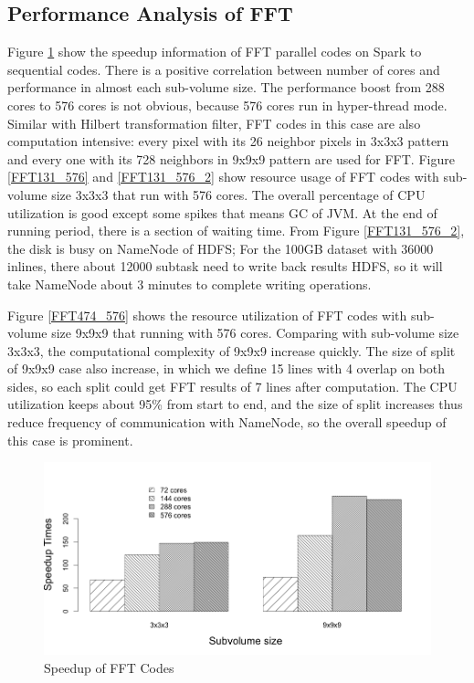 \subsection{Performance Analysis of FFT}
Figure \ref{FFTSpeedup} show the speedup information of FFT parallel codes on Spark to sequential codes. There is a positive correlation between number of cores and performance in almost each sub-volume size. The performance boost from 288 cores to 576 cores is not obvious, because 576 cores run in hyper-thread mode. Similar with Hilbert transformation filter, FFT codes in this case are also computation intensive: every pixel with its 26 neighbor pixels in 3x3x3 pattern and every one with its 728 neighbors in 9x9x9 pattern are used for FFT. Figure \ref{FFT131_576} and \ref{FFT131_576_2} show resource usage of FFT codes with sub-volume size 3x3x3 that run with 576 cores. The overall percentage of CPU utilization is good except some spikes that means GC of JVM. At the end of running period, there is a section of waiting time. From Figure \ref{FFT131_576_2}, the disk is busy on NameNode of HDFS; For the 100GB dataset with 36000 inlines, there about 12000 subtask need to write back results HDFS, so it will take NameNode about 3 minutes to complete writing operations.

Figure \ref{FFT474_576} shows the resource utilization of FFT codes with sub-volume size 9x9x9 that running with 576 cores. Comparing with sub-volume size 3x3x3, the computational complexity of 9x9x9 increase quickly. The size of split of 9x9x9 case also increase, in which we define 15 lines with 4 overlap on both sides, so each split could get FFT results of 7 lines after computation. The CPU utilization keeps about 95\% from start to end, and the size of split increases thus reduce frequency of communication with NameNode, so the overall speedup of this case is prominent. 

\begin{figure}[!ht]
\centering
\includegraphics[scale=.50]{figures/FFTSpeedup.png}
\caption{Speedup of FFT Codes}
\label{FFTSpeedup}
\end{figure}
 

